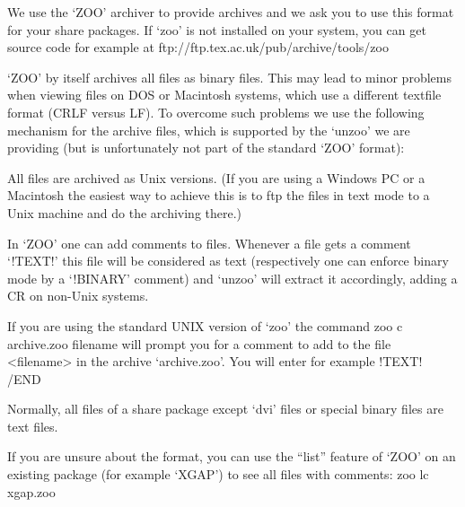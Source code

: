 We use the `ZOO' archiver to provide {\GAP} archives and we ask you to
use this format for your share packages. If `zoo' is not installed on your
system, you can get source code for example at
\begintt
ftp://ftp.tex.ac.uk/pub/archive/tools/zoo
\endtt

`ZOO' by itself archives all files as binary files. This may lead to minor
problems when viewing files on DOS or Macintosh systems, which use a
different textfile format (CRLF versus LF). To overcome such problems we use
the following mechanism for the {\GAP} archive files, which is supported by
the `unzoo' we are providing (but is unfortunately not part of the standard
`ZOO' format):

All files are archived as Unix versions. (If you are using a Windows PC or a
Macintosh the easiest way to achieve this is to ftp the files in text mode
to a Unix machine and do the archiving there.)

In `ZOO' one can add comments to files. Whenever a file gets a comment
`!TEXT!' this file  will be considered as text (respectively one can enforce
binary mode by a `!BINARY' comment) and `unzoo' will extract it accordingly,
adding a CR on non-Unix systems.

If you are using the standard UNIX version of `zoo' the command
\begintt
zoo c archive.zoo filename
\endtt
will prompt you for a comment to add to the file <filename> in the archive
`archive.zoo'. You will enter for example
\begintt
!TEXT!
/END
\endtt

Normally, all files of a share package except `dvi' files or special binary
files are text files.

If you are unsure about the format, you can use the ``list'' feature of
`ZOO' on an existing package (for example `XGAP') to see all files with
comments:
\begintt 
zoo lc xgap.zoo
\endtt 


